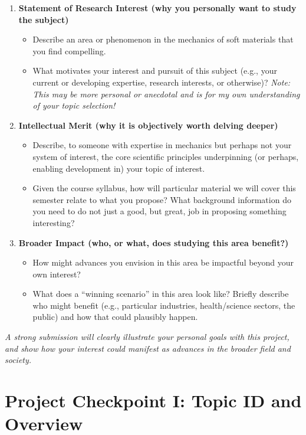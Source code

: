 \begin{enumerate}
\item \textbf{Statement of Research Interest (why you personally want to study the subject)}
\begin{itemize}
\item Describe an area or phenomenon in the mechanics of soft materials that you find compelling. 
\item What motivates your interest and pursuit of this subject (e.g., your current or developing expertise, research interests, or otherwise)? \textit{Note: This may be more personal or anecdotal and is for my own understanding of your topic selection!}
\end{itemize}
\item \textbf{Intellectual Merit (why it is objectively worth delving deeper)}
\begin{itemize}
\item Describe, to someone with expertise in mechanics but perhaps not your system of interest, the core scientific principles underpinning (or perhaps, enabling development in) your topic of interest. 
\item Given the course syllabus, how will particular material we will cover this semester relate to what you propose? What background information do you need to do not just a good, but great, job in proposing something interesting? 
\end{itemize}
\item \textbf{Broader Impact (who, or what, does studying this area benefit?)}
\begin{itemize}
\item How might advances you envision in this area be impactful beyond your own interest? 
\item What does a ``winning scenario'' in this area look like? Briefly describe who might benefit (e.g., particular industries, health/science sectors, the public) and how that could plausibly happen.
\end{itemize}
\end{enumerate}

\emph{A strong submission will clearly illustrate your personal goals with this project, and show how your interest could manifest as advances in the broader field and society.}

\newpage
\section*{Project Checkpoint I: Topic ID and Overview}

